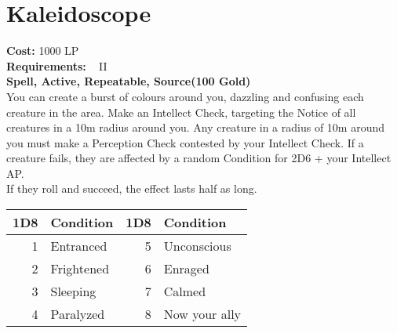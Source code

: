 \section{Kaleidoscope}\label{spell:kaleidoscope}
\textbf{Cost:} 1000 LP\\
\textbf{Requirements:} ~ II\\
\textbf{Spell, Active, Repeatable, Source(100 Gold)}\\
You can create a burst of colours around you, dazzling and confusing each creature in the area.
Make an Intellect Check, targeting the Notice of all creatures in a 10m radius around you.
Any creature in a radius of 10m around you must make a Perception Check contested by your Intellect Check.
If a creature fails, they are affected by a random Condition for 2D6 + your Intellect AP.\\
If they roll and succeed, the effect lasts half as long.\\

\begin{tabular}{r | l || r | l}
    1D8 & Condition & 1D8 & Condition\\
    \hline
    1 & Entranced & 5 & Unconscious \\
    2 & Frightened & 6 & Enraged \\
    3 & Sleeping & 7 & Calmed\\
    4 & Paralyzed & 8 & Now your ally \\
\end{tabular}